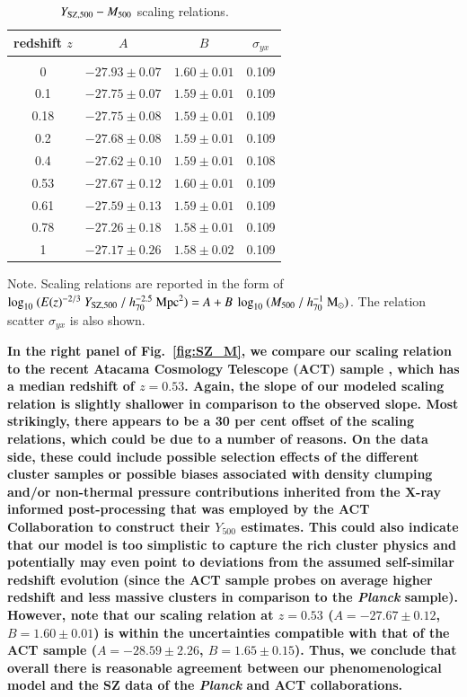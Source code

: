 \documentclass[useAMS,usenatbib]{mn2e}
\begin{document}
\begin{table} 
\begin{center}
\caption{$Y_{{\mathrm{SZ}}, 500}-M_{500}$ scaling relations.}
\medskip
\begin{tabular}{cccc}
\hline
\phantom{\Big|}
redshift $z$ & $A$ & $B$ & $\sigma_{yx}$ \\
\hline\\[-0.5em]
 0      & $-27.93\pm0.07$ & $1.60\pm0.01$ & 0.109\\
 0.1   & $-27.75\pm0.07$ & $1.59\pm0.01$ & 0.109\\
 0.18 & $-27.75\pm0.08$ & $1.59\pm0.01$ & 0.109\\
 0.2   & $-27.68\pm0.08$ & $1.59\pm0.01$ & 0.109\\ 
 0.4   & $-27.62\pm0.10$ & $1.59\pm0.01$ & 0.108\\
 0.53 & $-27.67\pm0.12$ & $1.60\pm0.01$ & 0.109\\
 0.61 & $-27.59\pm0.13$ & $1.59\pm0.01$ & 0.109\\ 
 0.78 & $-27.26\pm0.18$ & $1.58\pm0.01$ & 0.109\\ 
 1      & $-27.17\pm0.26$ & $1.58\pm0.02$ & 0.109\\[0.5em] 
\hline
\end{tabular}
\label{tab:YSZfits}
\end{center}
\footnotesize{Note. Scaling relations are reported in the form of $\log_{10}~(E(z)^{-2/3}~Y_{{\mathrm{SZ}},500}~/~h_{70}^{-2.5}~{\mathrm{Mpc}}^{2})=A+B~\log_{10}~(M_{500}~/~h_{70}^{-1}~{\mathrm{M_{\odot}}})$. The relation scatter $\sigma_{yx}$ is also shown.}
\end{table}

{\bf In the right panel of Fig.~\ref{fig:SZ_M}, we compare our scaling relation
  to the recent Atacama Cosmology Telescope (ACT) sample
  \citep{2013JCAP...07..008H}, which has a median redshift of $z=0.53$.  Again,
  the slope of our modeled scaling relation is slightly shallower in comparison
  to the observed slope. Most strikingly, there appears to be a 30 per cent
  offset of the scaling relations, which could be due to a number of reasons. On
  the data side, these could include possible selection effects of the different
  cluster samples or possible biases associated with density clumping and/or
  non-thermal pressure contributions inherited from the X-ray informed
  post-processing that was employed by the ACT Collaboration to construct their
  $Y_{500}$ estimates. This could also indicate that our model is too simplistic
  to capture the rich cluster physics and potentially may even point to
  deviations from the assumed self-similar redshift evolution (since the ACT
  sample probes on average higher redshift and less massive clusters in
  comparison to the {\em Planck} sample).  However, note that our scaling
  relation at $z=0.53$ ($A=-27.67\pm0.12$, $B=1.60\pm0.01$) is within the
  uncertainties compatible with that of the ACT sample ($A=-28.59\pm2.26$,
  $B=1.65\pm0.15$).  Thus, we conclude that overall there is reasonable
  agreement between our phenomenological model and the SZ data of the
  \emph{Planck} and ACT collaborations.}
 
\end{document}
